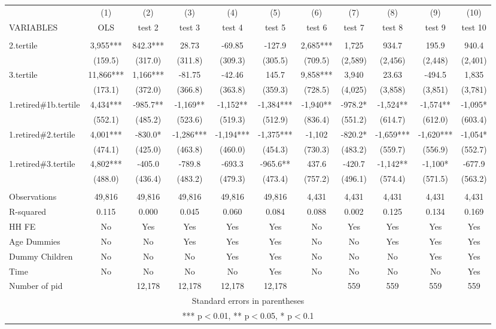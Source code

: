 \begin{tabular}{lcccccccccc} \hline
 & (1) & (2) & (3) & (4) & (5) & (6) & (7) & (8) & (9) & (10) \\
VARIABLES & OLS & test 2 & test 3 & test 4 & test 5 & test 6 & test 7 & test 8 & test 9 & test 10 \\ \hline
 &  &  &  &  &  &  &  &  &  &  \\
2.tertile & 3,955*** & 842.3*** & 28.73 & -69.85 & -127.9 & 2,685*** & 1,725 & 934.7 & 195.9 & 940.4 \\
 & (159.5) & (317.0) & (311.8) & (309.3) & (305.5) & (709.5) & (2,589) & (2,456) & (2,448) & (2,401) \\
3.tertile & 11,866*** & 1,166*** & -81.75 & -42.46 & 145.7 & 9,858*** & 3,940 & 23.63 & -494.5 & 1,835 \\
 & (173.1) & (372.0) & (366.8) & (363.8) & (359.3) & (728.5) & (4,025) & (3,858) & (3,851) & (3,781) \\
1.retired\#1b.tertile & 4,434*** & -985.7** & -1,169** & -1,152** & -1,384*** & -1,940** & -978.2* & -1,524** & -1,574** & -1,095* \\
 & (552.1) & (485.2) & (523.6) & (519.3) & (512.9) & (836.4) & (551.2) & (614.7) & (612.0) & (603.4) \\
1.retired\#2.tertile & 4,001*** & -830.0* & -1,286*** & -1,194*** & -1,375*** & -1,102 & -820.2* & -1,659*** & -1,620*** & -1,054* \\
 & (474.1) & (425.0) & (463.8) & (460.0) & (454.3) & (730.3) & (483.2) & (559.7) & (556.9) & (552.7) \\
1.retired\#3.tertile & 4,802*** & -405.0 & -789.8 & -693.3 & -965.6** & 437.6 & -420.7 & -1,142** & -1,100* & -677.9 \\
 & (488.0) & (436.4) & (483.2) & (479.3) & (473.4) & (757.2) & (496.1) & (574.4) & (571.5) & (563.2) \\
 &  &  &  &  &  &  &  &  &  &  \\
Observations & 49,816 & 49,816 & 49,816 & 49,816 & 49,816 & 4,431 & 4,431 & 4,431 & 4,431 & 4,431 \\
R-squared & 0.115 & 0.000 & 0.045 & 0.060 & 0.084 & 0.088 & 0.002 & 0.125 & 0.134 & 0.169 \\
HH FE & No & Yes & Yes & Yes & Yes & No & Yes & Yes & Yes & Yes \\
Age Dummies & No & No & Yes & Yes & Yes & No & No & Yes & Yes & Yes \\
Dummy Children & No & No & No & Yes & Yes & No & No & No & Yes & Yes \\
Time & No & No & No & No & Yes & No & No & No & No & Yes \\
 Number of pid &  & 12,178 & 12,178 & 12,178 & 12,178 &  & 559 & 559 & 559 & 559 \\ \hline
\multicolumn{11}{c}{ Standard errors in parentheses} \\
\multicolumn{11}{c}{ *** p$<$0.01, ** p$<$0.05, * p$<$0.1} \\
\end{tabular}
